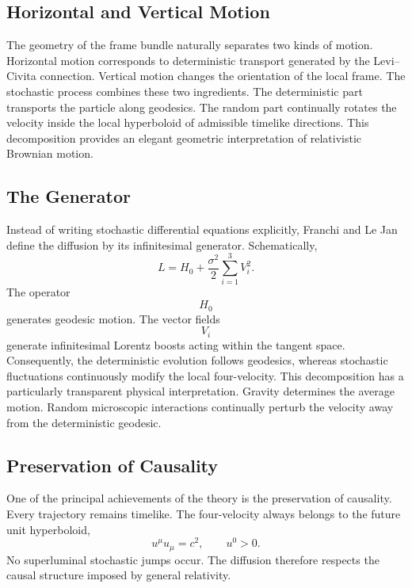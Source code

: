 \subsection{Horizontal and Vertical Motion}
The geometry of the frame bundle naturally separates two kinds of
motion.
Horizontal motion corresponds to deterministic transport generated by
the Levi--Civita connection.
Vertical motion changes the orientation of the local frame.
The stochastic process combines these two ingredients.
The deterministic part transports the particle along geodesics.
The random part continually rotates the velocity inside the local
hyperboloid of admissible timelike directions.
This decomposition provides an elegant geometric interpretation of
relativistic Brownian motion.
\subsection{The Generator}
Instead of writing stochastic differential equations explicitly,
Franchi and Le Jan define the diffusion by its infinitesimal generator.
Schematically,
\[L=H_0+\frac{\sigma^2}{2}\sum_{i=1}^{3}V_i^2.\]
The operator
\[H_0\]
generates geodesic motion.
The vector fields
\[V_i\]
generate infinitesimal Lorentz boosts acting within the tangent space.
Consequently,
the deterministic evolution follows geodesics,
whereas stochastic fluctuations continuously modify the local
four-velocity.
This decomposition has a particularly transparent physical
interpretation.
Gravity determines the average motion.
Random microscopic interactions continually perturb the velocity away
from the deterministic geodesic.
\subsection{Preservation of Causality}
One of the principal achievements of the theory is the preservation of
causality.
Every trajectory remains timelike.
The four-velocity always belongs to the future unit hyperboloid,
\[u^\mu u_\mu=c^2,\qquad u^0>0.\]
No superluminal stochastic jumps occur.
The diffusion therefore respects the causal structure imposed by general
relativity.
